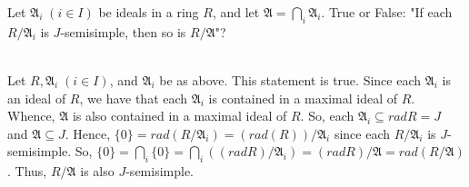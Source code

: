 Let $\mathfrak{A}_i\;(i\in I)$ be ideals in a ring $R$, and let
$\mathfrak{A}=\bigcap_i\mathfrak{A}_i$. True or False: "If each $R/\mathfrak{A}_i$ is $J$-semisimple,
then so is $R/\mathfrak{A}$"?\\

\begin{solution}\renewcommand{\qedsymbol}{}\ \\
    Let $R, \mathfrak{A}_i\;(i\in I)$, and $\mathfrak{A}_i$ be as above. This statement is true. Since
    each $\mathfrak{A}_i$ is an ideal of $R$, we have that each $\mathfrak{A}_i$ is contained in a
    maximal ideal of $R$. Whence, $\mathfrak{A}$ is also contained in a maximal ideal of $R$. So, each
    $\mathfrak{A}_i\subseteq rad R=J$ and $\mathfrak{A}\subseteq J$. Hence,
    $\{0\}=rad(R/\mathfrak{A}_i)=(rad(R))/\mathfrak{A}_i$ since each $R/\mathfrak{A}_i$ is
    $J$-semisimple. So,
    $\{0\}=\bigcap_i\{0\}=\bigcap_i((rad R)/\mathfrak{A}_i)=(rad R)/\mathfrak{A}=rad(R/\mathfrak{A})$.
    Thus, $R/\mathfrak{A}$ is also $J$-semisimple.

\end{solution}